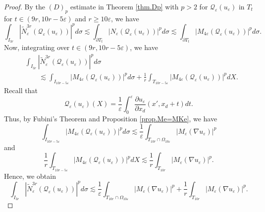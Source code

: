 \documentclass[reqno,12pt]{amsart} %
\theoremstyle{definition}
\theoremstyle{remark}
\numberwithin{equation}{section}
\newcommand{\Q}{\mathcal{Q}}
\newcommand{\e}{\varepsilon}
\begin{document}
\begin{proof}
By the $(D)_p$ estimate in Theorem \ref{thm.Dp} with $p>2$ for $\Q_\e(u_\e)$ in $T_{t}$ for $t\in (9r,10r-5\e)$ and $r \ge 10\e$, we have
\begin{equation}
    \int_{I_{3r}} |\widetilde{N}_\e^{3r} (\Q_\e(u_\e)) |^p d\sigma \lesssim \int_{\partial T_t} |N_\e(\Q_\e(u_\e))|^p d\sigma \lesssim \int_{\partial T_{t}} |M_{4\e}(\Q_\e(u_\e))|^p d\sigma.
\end{equation}
Now, integrating over $t \in (9r,10r-5\e)$, we have
\begin{equation}
\begin{aligned}
    & \int_{I_{3r}} |\widetilde{N}_\e^{3r} (\Q_\e(u_\e)) |^p d\sigma \\
    & \qquad \lesssim \int_{I_{10r-5\e}} |M_{4\e}(\Q_\e(u_\e))|^p d\sigma + \frac{1}{r} \int_{T_{10r-5\e}} |M_{4\e}(\Q_\e(u_\e))|^p dX.
    \end{aligned}
\end{equation}
Recall that
\begin{equation}
    \Q_\e(u_\e)(X) = \frac{1}{\e} \int_0^\e \frac{\partial u_\e}{\partial x_d}(x', x_d + t) dt.
\end{equation}
Thus, by Fubini's Theorem and Proposition \ref{prop.Me=MKe}, we have
\begin{equation}
    \int_{I_{10r-5\e}} |M_{4\e}(\Q_\e(u_\e))|^p d\sigma \lesssim \frac{1}{\e} \int_{T_{10r} \cap \Omega_{10\e}} |M_\e(\nabla u_\e)|^p
\end{equation}
and
\begin{equation}
    \frac{1}{r} \int_{T_{10r-5\e}} |M_{4\e}(\Q_\e(u_\e))|^p dX \lesssim \frac{1}{r} \int_{T_{10r}} |M_\e(\nabla u_\e)|^p.
\end{equation}
Hence, we obtain
\begin{equation}\label{est.NQe-1}
    \int_{I_{3r}} |\widetilde{N}_\e^{3r} (\Q_\e(u_\e)) |^p d\sigma \lesssim \frac{1}{\e} \int_{T_{10r} \cap \Omega_{10\e}} |M_\e(\nabla u_\e)|^p + \frac{1}{r} \int_{T_{10r}} |M_\e(\nabla u_\e)|^p.
\end{equation}


\end{proof}
\end{document}
